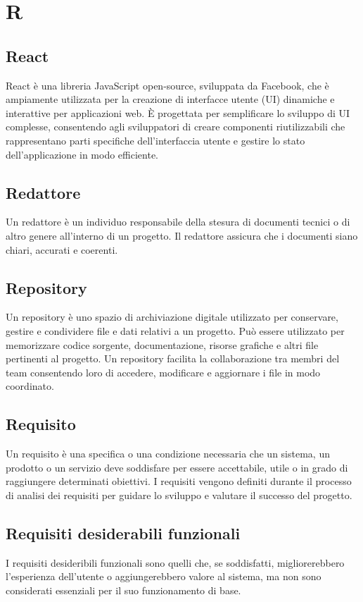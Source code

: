 \section*{R} 
\subsection*{React} 
React è una libreria JavaScript open-source, sviluppata da Facebook, che è ampiamente utilizzata per la creazione di interfacce utente (UI) dinamiche e interattive per applicazioni web. È progettata per semplificare lo sviluppo di UI complesse, consentendo agli sviluppatori di creare componenti riutilizzabili che rappresentano parti specifiche dell'interfaccia utente e gestire lo stato dell'applicazione in modo efficiente.
\subsection*{Redattore} 
Un redattore è un individuo responsabile della stesura di documenti tecnici o di altro genere all'interno di un progetto. Il redattore assicura che i documenti siano chiari, accurati e coerenti. 
\subsection*{Repository} 
Un repository è uno spazio di archiviazione digitale utilizzato per conservare, gestire e condividere file e dati relativi a un progetto. Può essere utilizzato per memorizzare codice sorgente, documentazione, risorse grafiche e altri file pertinenti al progetto. Un repository facilita la collaborazione tra membri del team consentendo loro di accedere, modificare e aggiornare i file in modo coordinato. 
\subsection*{Requisito} 
Un requisito è una specifica o una condizione necessaria che un sistema, un prodotto o un servizio deve soddisfare per essere accettabile, utile o in grado di raggiungere determinati obiettivi. I requisiti vengono definiti durante il processo di analisi dei requisiti per guidare lo sviluppo e valutare il successo del progetto. 
\subsection*{Requisiti desiderabili funzionali} 
I requisiti desideribili funzionali sono quelli che, se soddisfatti, migliorerebbero l'esperienza dell'utente o aggiungerebbero valore al sistema, ma non sono considerati essenziali per il suo funzionamento di base. 

